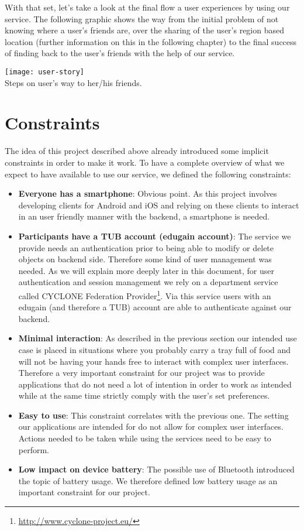 With that set, let's take a look at the final flow a user experiences by using our service. The following graphic shows the way from the initial problem of not knowing where a user's friends are, over the sharing of the user's region based location (further information on this in the following chapter) to the final success of finding back to the user's friends with the help of our service.

\begin{center}
    \texttt{[image: user-story]}\\
    Steps on user's way to her/his friends.
\end{center}


\section{Constraints}

The idea of this project described above already introduced some implicit constraints in order to make it work. To have a complete overview of what we expect to have available to use our service, we defined the following constraints:

\begin{itemize}
    \item \textbf{Everyone has a smartphone}: Obvious point. As this project involves developing clients for Android and iOS and relying on these clients to interact in an user friendly manner with the backend, a smartphone is needed.
    \item \textbf{Participants have a TUB account (edugain account)}: The service we provide needs an authentication prior to being able to modify or delete objects on backend side. Therefore some kind of user management was needed. As we will explain more deeply later in this document, for user authentication and session management we rely on a department service called CYCLONE Federation Provider\footnote{\url{http://www.cyclone-project.eu/}}. Via this service users with an edugain (and therefore a TUB) account are able to authenticate against our backend.
    \item \textbf{Minimal interaction}: As described in the previous section our intended use case is placed in situations where you probably carry a tray full of food and will not be having your hands free to interact with complex user interfaces. Therefore a very important constraint for our project was to provide applications that do not need a lot of intention in order to work as intended while at the same time strictly comply with the user's set preferences.
    \item \textbf{Easy to use}: This constraint correlates with the previous one. The setting our applications are intended for do not allow for complex user interfaces. Actions needed to be taken while using the services need to be easy to perform.
    \item \textbf{Low impact on device battery}: The possible use of Bluetooth introduced the topic of battery usage. We therefore defined low battery usage as an important constraint for our project.
\end{itemize}


